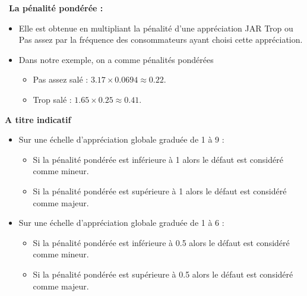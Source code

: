 \documentclass[aspectratio=169,xcolor=dvipsnames]{beamer}
\begin{document}
\begin{frame}
\textcolor{nyubluedarker}{\faCogs \ \textbf{La pénalité pondérée :}}

\vfill

	\begin{itemize}
	\item Elle est obtenue en multipliant la pénalité d'une appréciation JAR \og Trop \fg{} ou \og Pas assez \fg{} par la fréquence des consommateurs ayant choisi cette appréciation.
	\item Dans notre exemple, on a comme pénalités pondérées
		\begin{itemize}
		\item \og Pas assez \fg{} salé : $3.17\times0.0694 \approx 0.22$.
		\item \og Trop \fg{} salé : $1.65\times 0.25 \approx 0.41$.  
		\end{itemize}
	\end{itemize}

\vfill

\end{frame}

\begin{frame}
\textcolor{nyubluedarker}{\textbf{A titre indicatif}}

\medskip

		\begin{itemize}
		\item Sur une échelle d'appréciation globale graduée de 1 à 9 :
		\begin{itemize}
		\item Si la pénalité pondérée est inférieure à 1 alors le défaut est considéré comme mineur.
		\item Si la pénalité pondérée est supérieure à 1 alors le défaut est considéré comme majeur.
		\end{itemize}
		\item Sur une échelle d'appréciation globale graduée de 1 à 6 :
		\begin{itemize}
		\item Si la pénalité pondérée est inférieure à 0.5 alors le défaut est considéré comme mineur.
		\item Si la pénalité pondérée est supérieure à 0.5 alors le défaut est considéré comme majeur.
		\end{itemize}
		\end{itemize}
\end{frame}
\end{document}
